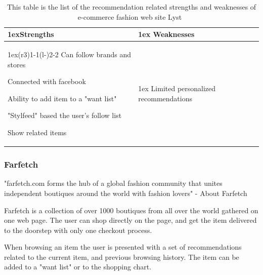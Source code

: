\begin{table}[H]
  \centering
    \begin{tabularx}{\linewidth}{>{\parskip1ex}X@{\kern4\tabcolsep}>{\parskip1ex}X}
    \toprule
      \hfil\bfseries Strengths
        &
        \hfil\bfseries Weaknesses
        \\\cmidrule(r{3\tabcolsep}){1-1}\cmidrule(l{-\tabcolsep}){2-2}
                Can follow brands and stores \par
                Connected with facebook \par
                Ability to add item to a "want list" \par
                "Stylfeed" based the user's follow list \par
                Show related items \par
                &
                Limited personalized recommendations \par
                \\\bottomrule
            \end{tabularx}
    \caption[Recommendation related strengths and weaknesses of Lyst~\cite{lyst}]{This table is the list of the recommendation related strengths and weaknesses of e-commerce fashion web site Lyst~\cite{lyst}}
    \label{table:ecommenreceLyst}
\end{table}

\subsubsection{Farfetch} %
\label{par:farfetch}

"farfetch.com forms the hub of a global fashion community that unites
independent boutiques around the world with fashion lovers" - About
Farfetch~\cite{Farfetch}

Farfetch is a collection of over 1000 boutiques from all over the world
gathered on one web page.  The user can shop directly on the page, and get the
item delivered to the doorstep with only one checkout process.

When browsing an item the user is presented with a set of recommendations
related to the current item, and previous browsing history.  The item can be
added to a "want list" or to the shopping chart.

